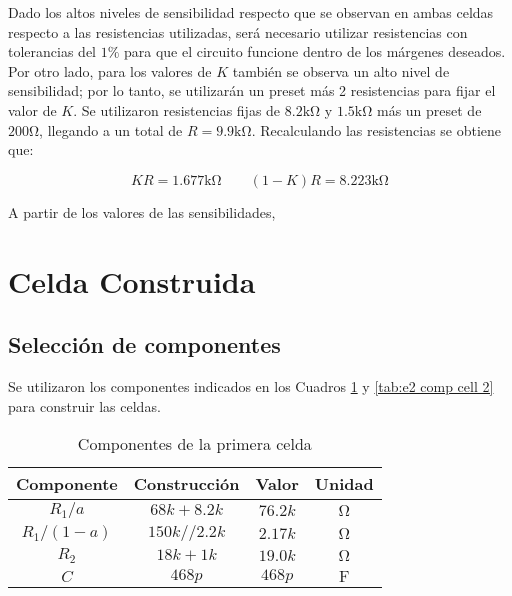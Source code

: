 Dado los altos niveles de sensibilidad respecto que se observan en ambas celdas respecto a las resistencias utilizadas, será necesario utilizar resistencias con tolerancias del $1\%$ para que el circuito funcione dentro de los márgenes deseados.
Por otro lado, para los valores de $K$ también se observa un alto nivel de sensibilidad; por lo tanto, se utilizarán un preset más 2 resistencias para fijar el valor de $K$. Se utilizaron resistencias fijas de $8.2\si{\kilo\ohm}$ y $1.5\si{\kilo\ohm}$ más un preset de $200\si{\ohm}$, llegando a un total de $R = 9.9 \si{\kilo\ohm}$. Recalculando las resistencias se obtiene que:

\begin{equation*}
KR = 1.677\si{\kilo\ohm} \qquad (1-K)R = 8.223 \si{\kilo\ohm}
\end{equation*}

A partir de los valores de las sensibilidades, 

\section{Celda Construida}

\subsection{Selección de componentes}

Se utilizaron los componentes indicados en los Cuadros \ref{tab:e2 comp cell 1} y \ref{tab:e2 comp cell 2} para construir las celdas.

\begin{table}[ht]
\begin{center}
\begin{tabular}{||c|c|c|c||}
\hline
Componente	&	Construcción	&	Valor	&	Unidad	\\
\hline
$R_1/a$	&	$68k + 8.2 k$	&	$76.2 k$	&	$\si{\ohm}$	\\
$R_1/(1-a)$	&	$150k // 2.2 k$	&	$2.17 k$	&	$\si{\ohm}$	\\
$R_2$ &	$18 k + 1 k$	&$19.0k$&	$\si{\ohm}$	\\
$C$	&	$468 p$	&	$468 p$	&	$\si{\farad}$	\\
\hline
\end{tabular}
\caption{Componentes de la primera celda}
\label{tab:e2 comp cell 1}
\end{center}
\end{table}


